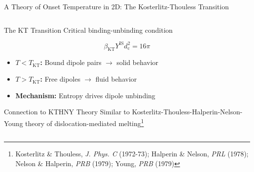 \begin{frame}{A Theory of Onset Temperature in 2D: The Kosterlitz-Thouless Transition}
\begin{columns}[T]
\begin{column}[T]{0.5\textwidth}
\begin{block}{\centering \large The KT Transition}
Critical binding-unbinding condition
\end{block}

\vspace{0.5em}

$$\boxed{\beta_\mathrm{KT} Y^\mathrm{IS} d_\mathrm{c}^2 = 16 \pi}$$

\vspace{0.5em}

\begin{itemize}
\item \textbf{$T < T_\mathrm{KT}$:} Bound dipole pairs $\to$ solid behavior
\item \textbf{$T > T_\mathrm{KT}$:} Free dipoles $\to$ fluid behavior
\item \textbf{Mechanism:} Entropy drives dipole unbinding
\end{itemize}

\vspace{0.5em}

\begin{block}{\centering Connection to KTHNY Theory}
Similar to Kosterlitz-Thouless-Halperin-Nelson-Young theory of dislocation-mediated melting\footnote{Kosterlitz \& Thouless, \textit{J. Phys. C} (1972-73); Halperin \& Nelson, \textit{PRL} (1978); Nelson \& Halperin, \textit{PRB} (1979); Young, \textit{PRB} (1979)}
\end{block}

\end{column}
\end{columns}

\end{frame}